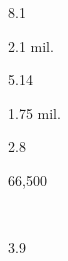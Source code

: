 \begin{description}[font=\normalfont,style=nextline]
\item[\langnameLango] 
 \begin{multicols}{2}\begin{description}[font=\normalfont\itshape,noitemsep] 
 \item[] 
 \item[\pbnumberabbr] 8.1 
 \item[\family] \famNiloSaharan 
 \item[]
\item[\nativespeakers] 2.1 mil. 
 \item[\region] \regionUganda 
 \end{description}\end{multicols}
\item[\langnameLatvian] 
 \begin{multicols}{2}\begin{description}[font=\normalfont\itshape,noitemsep] 
 \item[] 
 \item[\pbnumberabbr] 5.14 
 \item[\family] \famIndoEuropean 
 \item[]
\item[\nativespeakers] 1.75 mil. 
 \item[\region] \regionLatvia 
 \end{description}\end{multicols}
\item[\langnameLepcha] 
 \begin{multicols}{2}\begin{description}[font=\normalfont\itshape,noitemsep] 
 \item[] 
 \item[\pbnumberabbr] 2.8 
 \item[\family] \famSinoTibetan 
 \item[]
\item[\nativespeakers] 66,500 
 \item[\region] \regionSikkim\ \Brackets{\regionIndia}
 \end{description}\end{multicols}
\item[\langnameLigurian] 
 \begin{multicols}{2}\begin{description}[font=\normalfont\itshape,noitemsep] 
 \item[] 
 \item[\pbnumberabbr] 3.9 
 \item[\family] \famIndoEuropean 
 \item[]

\end{description}
\end{multicols}
\end{description}
